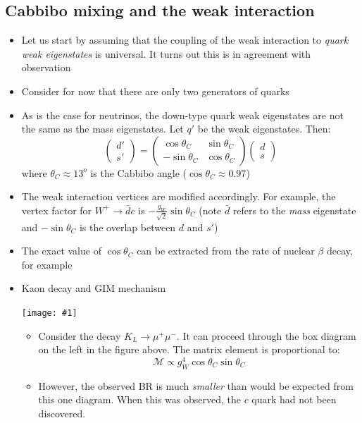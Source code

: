 \documentclass[11pt]{article}
\newcommand{\dbar}{\bar{d}}
\newcommand{\Mme}{\mathcal{M}}
\newcommand{\embedimgw}[2]{\begin{center}\texttt{[image: \#1]}\end{center}}
\begin{document}
\subsection{Cabbibo mixing and the weak interaction}
\begin{itemize}
  \item Let us start by assuming that the coupling of the weak interaction to \emph{quark weak eigenstates} is universal. It turns out this is in agreement with observation
  \item Consider for now that there are only two generators of quarks
  \item As is the case for neutrinos, the down-type quark weak eigenstates are not the same as the mass eigenstates. Let $q'$ be the weak eigenstates. Then:
  \begin{equation}
    \begin{pmatrix} d' \\ s' \end{pmatrix}
     = \begin{pmatrix} \cos\theta_C & \sin\theta_C \\ -\sin\theta_C & \cos\theta_C \end{pmatrix}
    \begin{pmatrix} d \\ s \end{pmatrix}
  \end{equation}
  where $\theta_C\approx 13^o$ is the Cabbibo angle ($\cos\theta_C \approx 0.97$)
  \item The weak interaction vertices are modified accordingly. For example, the vertex factor for $W^+\rightarrow \dbar c$ is $-\frac{g_W}{\sqrt2}\sin\theta_C$ (note $\dbar$ refers to the \emph{mass} eigenstate and $-\sin\theta_C$ is the overlap between $d$ and $s'$)
  \item The exact value of $\cos\theta_C$ can be extracted from the rate of nuclear $\beta$ decay, for example
  \item Kaon decay and GIM mechanism
  \embedimgw{figs/kLdecay.png}{.6}
  \begin{itemize}
    \item Consider the decay $K_L \rightarrow \mu^+\mu^-$. It can proceed through the box diagram on the left in the figure above. The matrix element is proportional to:
    \begin{equation}
      \Mme \propto g_W^4\cos\theta_C\sin\theta_C
    \end{equation}
    \item However, the observed BR is much \emph{smaller} than would be expected from this one diagram. When this was observed, the $c$ quark had not been discovered.

\end{itemize}
\end{itemize}
\end{document}

